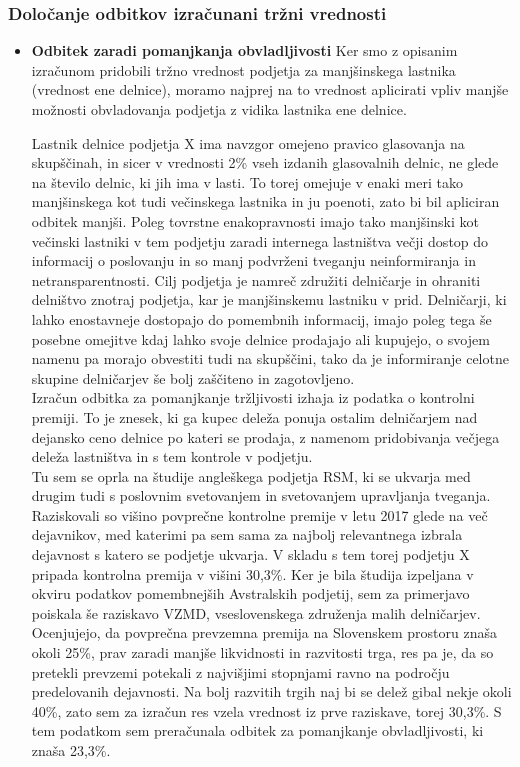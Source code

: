 \documentclass[12pt,a4paper]{amsart}
\theoremstyle{definition} %
\theoremstyle{plain} %
\begin{document}
\subsubsection{Določanje odbitkov izračunani tržni vrednosti}
\begin{itemize}
\item{\textbf{Odbitek zaradi pomanjkanja obvladljivosti}}
Ker smo z opisanim izračunom pridobili tržno vrednost podjetja za manjšinskega lastnika (vrednost ene delnice), moramo najprej na to vrednost aplicirati vpliv manjše možnosti obvladovanja podjetja z vidika lastnika ene delnice.\par
Lastnik delnice podjetja X ima navzgor omejeno pravico glasovanja na skupščinah, in sicer v vrednosti 2\% vseh izdanih glasovalnih delnic, ne glede na število delnic, ki jih ima v lasti. To torej omejuje v enaki meri tako manjšinskega kot tudi večinskega lastnika in ju poenoti, zato bi bil apliciran odbitek manjši. Poleg tovrstne enakopravnosti imajo tako manjšinski kot večinski lastniki v tem podjetju zaradi internega lastništva večji dostop do informacij o poslovanju in so manj podvrženi tveganju neinformiranja in netransparentnosti. Cilj podjetja je namreč združiti delničarje in ohraniti delništvo znotraj podjetja, kar je manjšinskemu lastniku v prid. Delničarji, ki lahko enostavneje dostopajo do pomembnih informacij, imajo poleg tega še posebne omejitve kdaj lahko svoje delnice prodajajo ali kupujejo, o svojem namenu pa morajo obvestiti tudi na skupščini, tako da je informiranje celotne skupine delničarjev še bolj zaščiteno in zagotovljeno. \\
Izračun odbitka za pomanjkanje tržljivosti izhaja iz podatka o kontrolni premiji. To je znesek, ki ga kupec deleža ponuja ostalim delničarjem nad dejansko ceno delnice po kateri se prodaja, z namenom pridobivanja večjega deleža lastništva in s tem kontrole v podjetju.\\
Tu sem se oprla na študije angleškega podjetja RSM, ki se ukvarja med drugim tudi s poslovnim svetovanjem in svetovanjem upravljanja tveganja. Raziskovali so višino povprečne kontrolne premije v letu 2017 glede na več dejavnikov, med katerimi pa sem sama za najbolj relevantnega izbrala dejavnost s katero se podjetje ukvarja. V skladu s tem torej podjetju X pripada kontrolna premija v višini 30,3\%. Ker je bila študija izpeljana v okviru podatkov pomembnejših Avstralskih podjetij, sem za primerjavo poiskala še raziskavo VZMD, vseslovenskega združenja malih delničarjev. Ocenjujejo, da povprečna prevzemna premija na Slovenskem prostoru znaša okoli 25\%, prav zaradi manjše likvidnosti in razvitosti trga, res pa je, da so pretekli prevzemi potekali z najvišjimi stopnjami ravno na področju predelovanih dejavnosti. Na bolj razvitih trgih naj bi se delež gibal nekje okoli 40\%, zato sem za izračun res vzela vrednost iz prve raziskave, torej 30,3\%. S tem podatkom sem preračunala odbitek za pomanjkanje obvladljivosti, ki znaša 23,3\%.\\


\end{itemize}
\end{document}
